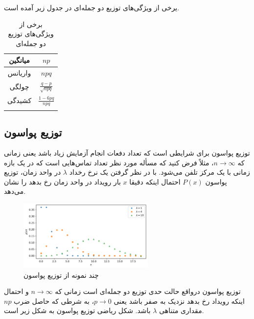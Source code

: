یرخی از ویژگی‌های توزیع دو جمله‌ای در جدول زیر آمده است.

\bgroup
\def\arraystretch{1.5}
\begin{table}[htb]
    \centering
    \caption{برخی از ویژگی‌های توزیع دو جمله‌ای}
    \begin{tabular}{ c c }
    \hline
     \vspace{4pt}
     میانگین & $np$ \\ \hline
     \vspace{4pt}
     واریانس & $npq$ \\ \hline
     \vspace{4pt}
     چولگی & $\frac{q-p}{\sqrt{npq}}$ \\ \hline
     \vspace{4pt}
     کشیدگی & $\frac{1-6pq}{npq}$ \\ \hline
     \vspace{4pt}
    \end{tabular}
\end{table}
\egroup
\FloatBarrier

\subsection{توزیع پواسون}
توزیع پواسون برای شرایطی است که تعداد دفعات انجام آزمایش زیاد باشد یعنی زمانی که $n \rightarrow \infty$، مثلاً فرض کنید که مسأله مورد نظر تعداد تماس‌هایی است که در یک بازه زمانی با یک مرکز تلفن می‌شود. با در نظر گرفتن یک نرخ رخداد $\lambda$ در واحد زمان، توزیع پواسون $P(x)$ احتمال اینکه دقیقا $x$ بار رویداد در واحد زمان رخ بدهد را نشان می‌دهد.\cite{Walck1996HandbookOS}
\begin{figure}[htb]
    \centering
    \includegraphics[width=0.6\textwidth]{images/poisson.pdf}
    \caption{چند نمونه از توزیع پواسون} %
    \par\medskip
\captionsetup{justification=centering}
\end{figure}
\FloatBarrier
توزیع پواسون در‌واقع حالت حدی توزیع دو جمله‌ای است زمانی که $n \rightarrow \infty$ و احتمال اینکه رویداد رخ بدهد نزدیک به صفر باشد یعنی $p \rightarrow 0$، به شرطی که حاصل ضرب $np$ مقداری متناهی $\lambda$ باشد. شکل ریاضی توزیع پواسون به شکل زیر است.

